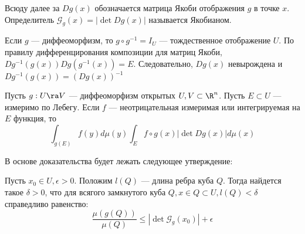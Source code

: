\begin{definition}
    Всюду далее за \(Dg(x)\) обозначается матрица Якоби отображения \(g\) в точке \(x\). Определитель \(\mathcal{G}_g(x) = |\det Dg(x)|\) называется Якобианом.
\end{definition}

\begin{definition}
    Если \(g\) --- диффеоморфизм, то \(g\circ g^{-1} = I_U\) --- тождественное отображение \(U\). По правилу дифференцирования композиции для матриц Якоби, \(Dg^{-1}(g(x))Dg(g^{-1}(x)) = E\). Следовательно, \(Dg(x)\) невырождена и \(Dg^{-1}(g(x)) = (Dg(x))^{-1}\)
\end{definition}

\begin{theorem}
    Пусть \(g: U \ra V\) --- диффеоморфизм открытых \(U, V \subset \R^n\). Пусть \(E \subset U\) --- измеримо по Лебегу. Если \(f\) --- неотрицательная измеримая или интегрируемая на \(E\) функция, то
    \[\int_{g(E)} f(y) d\mu(y) \int_E f \circ g(x) |\det Dg(x)|d\mu(x)\]
\end{theorem}
В основе доказательства будет лежать следующее утверждение:
\begin{lemma}
    Пусть \(x_0 \in U, \epsilon > 0\). Положим \(l(Q)\) --- длина ребра куба \(Q\). Тогда найдется такое \(\delta > 0\), что для всягого замкнутого куба \(Q, x \in Q \subset U, l(Q) < \delta\) справедливо равенство:
    \[\frac{\mu(g(Q))}{\mu(Q)} \le |\det \mathcal{G}_g(x_0)| + \epsilon\]
\end{lemma}

